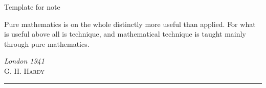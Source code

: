 \documentclass{note}
\begin{document}
\clearpage

\thispagestyle{empty}
\clearpage

\begin{titlepage}
\thispagestyle{empty} %
\noindent
\titlefont Template for note\par
\epigraph{Pure mathematics is on the whole distinctly more useful than applied. For what is useful above all is technique, and mathematical technique is taught mainly through pure mathematics.}%
{\textit{London 1941}\\ \textsc{G. H. Hardy}}
\null\vfill
\vspace*{1cm}
\noindent
\hfill
\begin{minipage}{0.5\linewidth}
    \begin{flushright}
        \printauthor
    \end{flushright}
\end{minipage}
%
\begin{minipage}{0.02\linewidth}
    \rule{1pt}{60pt}
\end{minipage}
\titlepagedecoration

\clearpage
~
\thispagestyle{empty}
\clearpage

\end{titlepage}

{
    \hypersetup{linkcolor=red!65!black} %
    \tableofcontents
}

\frontmatter


\end{document}
